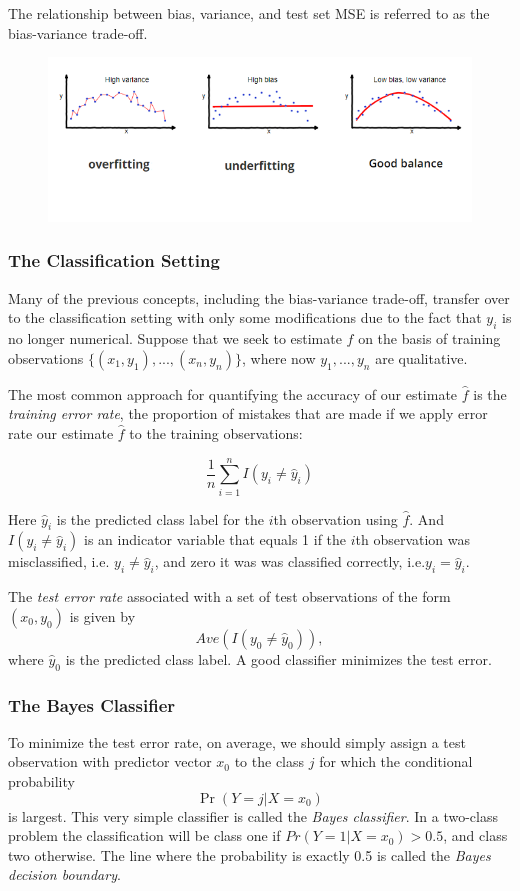 \documentclass{article}
\begin{document}
The relationship between bias, variance, and test set MSE is referred to as the bias-variance trade-off. 

\begin{figure}[h]
    \centering
    \includegraphics[width=13cm]{bias-variance-tradeoff.png}
\end{figure}


\subsubsection{The Classification Setting}
Many of the previous concepts, including the bias-variance trade-off, transfer over to the classification setting with only some modifications due to the fact that $y_i$ is no longer numerical. Suppose that we seek to estimate $f$ on the basis of training observations $\{(x_1, y_1),...,(x_n, y_n)\}$, where now $y_1,...,y_n$ are qualitative.

The most common approach for quantifying the accuracy of our estimate $\hat f$ is the \textit{training error rate}, the proportion of mistakes that are made if we apply error rate our estimate $\hat f$ to the training observations:

\[
    \frac{1}{n} \sum_{i=1}^n I(y_i  \neq \hat y_i)
\]

Here $\hat y_i$ is the predicted class label for the $i$th observation using $\hat f$. And $I(y_i \neq \hat y_i)$ is an indicator variable that equals 1 if the $i$th observation was misclassified, i.e. $y_i \neq \hat y_i$, and zero it was was classified correctly, i.e.$y_i = \hat y_i$.


The \textit{test error rate} associated with a set of test observations of the form $(x_0, y_0)$ is given by
\[
    Ave(I(y_0 \neq \hat y_0)),
\]
where $\hat y_0$ is the predicted class label. A good classifier minimizes the test error.

\subsubsection{The Bayes Classifier}
To minimize the test error rate, on average, we should simply assign a test observation with predictor vector $x_0$ to the class $j$ for which the conditional probability
\[
    \Pr(Y = j|X = x_0)
\]
is largest. This very simple classifier is called the \textit{Bayes classifier}. In a two-class problem the classification will be class one if $Pr(Y = 1|X = x_0) > 0.5$, and class two otherwise. The line where the probability is exactly 0.5 is called the \textit{Bayes decision boundary}.
\end{document}
